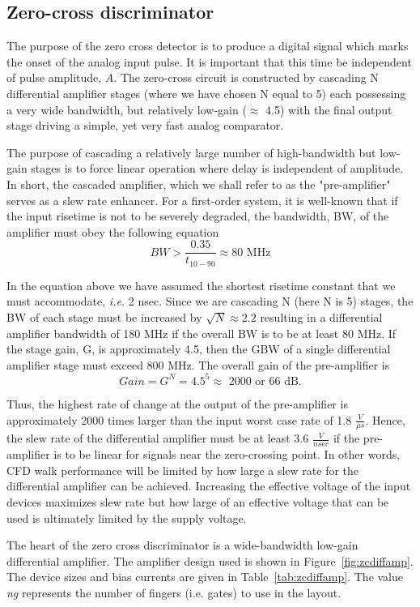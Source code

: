 \documentclass[12pt,oneside,final]{siuethesis}
\theoremstyle{definition}
\begin{document}
\subsection{Zero-cross discriminator}
\par The purpose of the zero cross detector is to produce a digital signal which marks the onset of the analog input pulse. It is important that this time be independent of pulse amplitude, $A$.  The zero-cross circuit is constructed by cascading N differential amplifier stages (where we have chosen N equal to 5) each possessing a very wide bandwidth, but relatively low-gain ($\approx$ 4.5) with the final output stage driving a simple, yet very fast analog comparator.
\par The purpose of cascading a relatively large number of high-bandwidth but low-gain stages is to force linear operation where delay is independent of amplitude. In short, the cascaded amplifier, which we shall refer to as the "pre-amplifier" serves as a slew rate enhancer.  For a first-order system, it is well-known that if the input risetime is not to be severely degraded, the bandwidth, BW, of the amplifier must obey the following equation
\begin{equation}
BW > \frac{0.35}{t_{10-90}} \approx \text{80 MHz}
\end{equation}
\par In the equation above we have assumed the shortest risetime constant that we must accommodate, \emph{i.e.}  2 nsec. Since we are cascading N (here N is 5) stages, the BW of each stage must be increased by $\sqrt{N} \approx 2.2$ resulting in a differential amplifier bandwidth of 180 MHz if the overall BW is to be at least 80 MHz.  If the stage gain, G, is approximately 4.5, then the GBW of a single differential amplifier stage must exceed 800 MHz. The overall gain of the pre-amplifier is
\begin{equation}
Gain = G^N = 4.5^5 \approx \text{ 2000 or 66 dB}.
\end{equation}
\par Thus, the highest rate of change at the output of the pre-amplifier is approximately 2000 times larger than the input worst case rate of 1.8 $\frac{V}{\mu s}$.  Hence, the slew rate of the differential amplifier must be at least 3.6 $\frac{V}{nsec}$ if the pre-amplifier is to be linear for signals near the zero-crossing point. In other words, CFD walk performance will be limited by how large a slew rate for the differential amplifier can be achieved. Increasing the effective voltage of the input devices maximizes slew rate but how large of an effective voltage that can be used is ultimately limited by the supply voltage.
\par The heart of the zero cross discriminator is a wide-bandwidth low-gain differential amplifier. The amplifier design used is shown in Figure~\ref{fig:zcdiffamp}. The device sizes and bias currents are given in Table~\ref{tab:zcdiffamp}. The value \emph{ng} represents the number of fingers (i.e. gates) to use in the layout.
\end{document}

